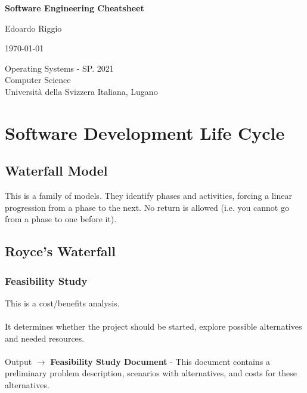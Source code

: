 \documentclass{article}
\begin{document}
\begin{titlepage}
    \begin{center}
        \vspace*{1cm}
        
        \Huge
        \textbf{Software Engineering Cheatsheet}
        
        \vspace{0.5cm}
        \LARGE
        
        \vspace{.5cm}
        
        Edoardo Riggio
   		  \vspace{1.5cm}
       
        \vfill
        
        \today
        
        \vspace{.8cm}
          \Large
          Operating Systems - SP. 2021 \\
        Computer Science\\
        Universit\`{a} della Svizzera Italiana, Lugano\\
        
    \end{center}
\end{titlepage}

\tableofcontents

\newpage

\section{Software Development Life Cycle}
\subsection{Waterfall Model}
This is a family of models. They identify phases and activities, forcing a linear progression from a phase to the next. No return is allowed (i.e. you cannot go from a phase to one before it).

\subsection{Royce's Waterfall}
\subsubsection{Feasibility Study}
This is a cost/benefits analysis. \\ \\
It determines whether the project should be started, explore possible alternatives and needed resources. \\ \\
Output $\rightarrow$ \textbf{Feasibility Study Document} - This document contains a preliminary problem description, scenarios with alternatives, and costs for these alternatives.
\end{document}
